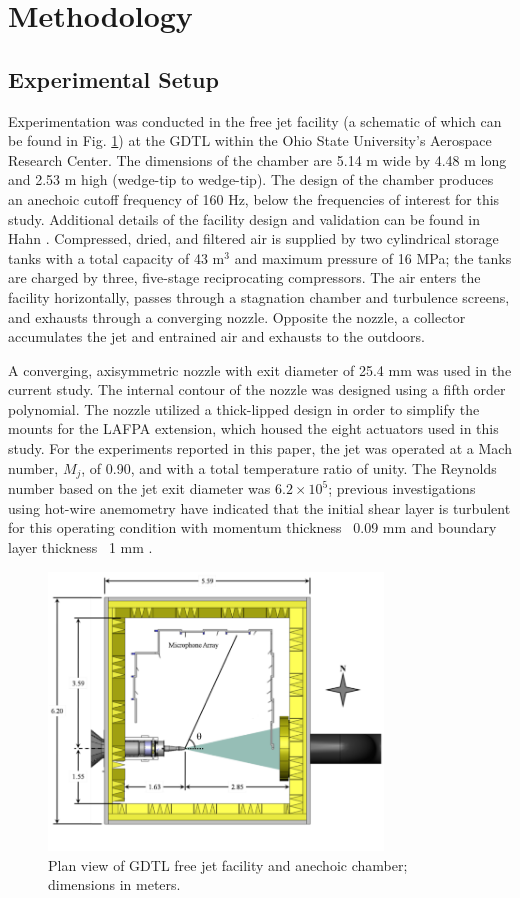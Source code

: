 \documentclass[english]{aiaa-tc}
\begin{document}
\section{Methodology}
\subsection{Experimental Setup\label{expersetup}}
Experimentation was conducted in the free jet facility (a schematic of which can be found in Fig. \ref{GDTLschematic}) at the GDTL within the Ohio State University's Aerospace Research Center. The dimensions of the chamber are 5.14 m wide by 4.48 m long and 2.53 m high (wedge-tip to wedge-tip). The design of the chamber produces an anechoic cutoff frequency of 160 Hz, below the frequencies of interest for this study. Additional details of the facility design and validation can be found in Hahn \cite{Hahn2011}. Compressed, dried, and filtered air is supplied by two cylindrical storage tanks with a total capacity of 43 m$^3$ and maximum pressure of 16 MPa; the tanks are charged by three, five-stage reciprocating compressors. The air enters the facility horizontally, passes through a stagnation chamber and turbulence screens, and exhausts through a converging nozzle. Opposite the nozzle, a collector accumulates the jet and entrained air and exhausts to the outdoors.

A converging, axisymmetric nozzle with exit diameter of 25.4 mm was used in the current study. The internal contour of the nozzle was designed using a fifth order polynomial. The nozzle utilized a thick-lipped design in order to simplify the mounts for the LAFPA extension, which housed the eight actuators used in this study. For the experiments reported in this paper, the jet was operated at a Mach number, $M_{j}$, of 0.90, and with a total temperature ratio of unity. The Reynolds number based on the jet exit diameter was $6.2 \times 10^{5}$; previous investigations using hot-wire anemometry have indicated that the initial shear layer is turbulent for this operating condition with momentum thickness ~0.09 mm and boundary layer thickness ~1 mm \cite{kfm2009-1}. 
\begin{figure}
	\begin{center}
		\includegraphics[width=3.5in]{GDTL_facility_schematic.png}
		\caption{Plan view of GDTL free jet facility and anechoic chamber; dimensions in meters.}\label{GDTLschematic}
	\end{center}
\end{figure}
	
\end{document}
